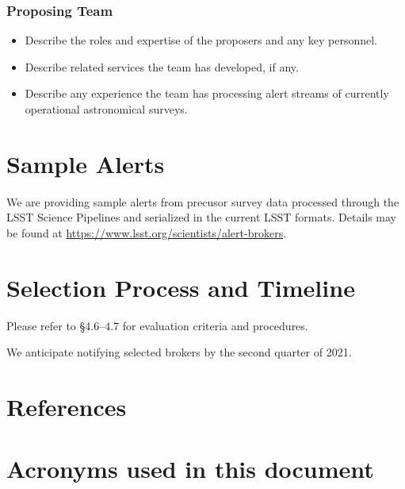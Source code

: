 \documentclass[DM,toc,lsstdraft]{lsstdoc}
\begin{document}
\subsubsection{Proposing Team}

\begin{itemize}
\item Describe the roles and expertise of the proposers and any key personnel.
\item Describe related services the team has developed, if any.
\item Describe any experience the team has processing alert streams of currently operational astronomical surveys. 
\end{itemize}


\section{Sample Alerts}

We are providing sample alerts from precusor survey data processed through the LSST Science Pipelines and serialized in the current LSST formats.
Details may be found at \url{https://www.lsst.org/scientists/alert-brokers}.

\section{Selection Process and Timeline}

Please refer to  \S4.6--4.7 for evaluation criteria and procedures.

We anticipate notifying selected brokers by the second quarter of 2021.

\section{References} \label{sec:bib}

\renewcommand{\refname}{}


\section{Acronyms used in this document}\label{sec:acronyms}

\end{document}

